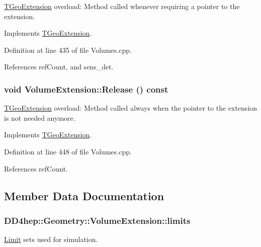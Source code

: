 \hyperlink{class_t_geo_extension}{TGeoExtension} overload: Method called whenever requiring a pointer to the extension. 

Implements \hyperlink{class_t_geo_extension_addd8a323d93527519b94e2db3acbf9d5}{TGeoExtension}.

Definition at line 435 of file Volumes.cpp.

References refCount, and sens\_\-det.\hypertarget{class_d_d4hep_1_1_geometry_1_1_volume_extension_ad61d398432c27ba62103ba5daa1d431d}{
\subsubsection[{Release}]{\setlength{\rightskip}{0pt plus 5cm}void VolumeExtension::Release () const}}
\label{class_d_d4hep_1_1_geometry_1_1_volume_extension_ad61d398432c27ba62103ba5daa1d431d}


\hyperlink{class_t_geo_extension}{TGeoExtension} overload: Method called always when the pointer to the extension is not needed anymore. 

Implements \hyperlink{class_t_geo_extension_af3013d9059744f1d7f9f9037a57bf3da}{TGeoExtension}.

Definition at line 448 of file Volumes.cpp.

References refCount.

\subsection{Member Data Documentation}
\hypertarget{class_d_d4hep_1_1_geometry_1_1_volume_extension_a2197ef0277ad4fdebc1a285ec311d019}{
\subsubsection[{limits}]{ {\bf DD4hep::Geometry::VolumeExtension::limits}}}
\label{class_d_d4hep_1_1_geometry_1_1_volume_extension_a2197ef0277ad4fdebc1a285ec311d019}


\hyperlink{class_d_d4hep_1_1_geometry_1_1_limit}{Limit} sets used for simulation. 

